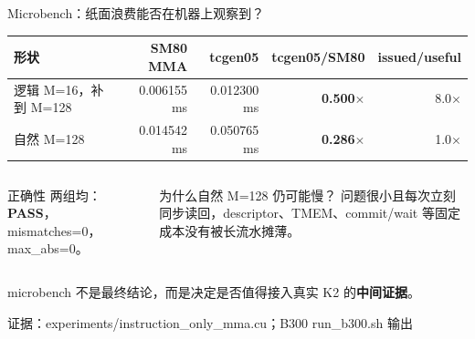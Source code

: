 \documentclass[aspectratio=169,10pt]{beamer}
\newcommand{\good}[1]{\textcolor{KdaGreen}{\ifmmode\boldsymbol{#1}\else\textbf{#1}\fi}}
\newcommand{\bad}[1]{\textcolor{KdaRed}{\ifmmode\boldsymbol{#1}\else\textbf{#1}\fi}}
\newcommand{\key}[1]{\textcolor{KdaBlue}{\ifmmode\boldsymbol{#1}\else\textbf{#1}\fi}}
\newcommand{\source}[1]{\vfill\hfill{\tiny\color{KdaGray}证据：#1}}
\begin{document}
\begin{frame}{Microbench：纸面浪费能否在机器上观察到？}
  \small
  \begin{center}
  \begin{tabular}{lrrrr}
    \toprule
    形状 & SM80 MMA & tcgen05 & tcgen05/SM80 & issued/useful \\
    \midrule
    逻辑 M=16，补到 M=128 & 0.006155 ms & 0.012300 ms & \bad{0.500$\times$} & 8.0$\times$ \\
    自然 M=128 & 0.014542 ms & 0.050765 ms & \bad{0.286$\times$} & 1.0$\times$ \\
    \bottomrule
  \end{tabular}
  \end{center}

  \vspace{0.7em}
  \begin{columns}[T,onlytextwidth]
      \begin{block}{正确性}
        两组均：\good{PASS}，mismatches=0，max\_abs=0。
      \end{block}
      \begin{block}{为什么自然 M=128 仍可能慢？}
        问题很小且每次立刻同步读回，descriptor、TMEM、commit/wait 等固定成本没有被长流水摊薄。
      \end{block}
  \end{columns}

  \centering
  microbench 不是最终结论，而是决定是否值得接入真实 K2 的\key{中间证据}。

  \source{experiments/instruction\_only\_mma.cu；B300 run\_b300.sh 输出}
\end{frame}
\end{document}
